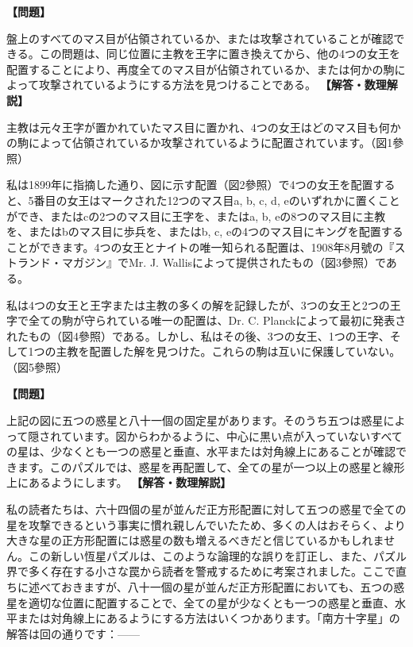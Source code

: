 \documentclass[10pt,a4paper,oneside,openany]{ltjsbook}
\begin{document}
\begin{tcolorbox}[colback=softblue,colframe=primaryblue,title=\textbf{第 313 問：女王と主教のパズル （原題: QUEENS AND BISHOP PUZZLE.）},arc=2mm,boxrule=1pt,breakable]
\textbf{【問題】}\par\vspace{0.3em}
盤上のすべてのマス目が佔領されているか、または攻撃されていることが確認できる。この問題は、同じ位置に主教を王字に置き換えてから、他の4つの女王を配置することにより、再度全てのマス目が佔領されているか、または何かの駒によって攻撃されているようにする方法を見つけることである。
\tcblower
\textbf{【解答・数理解説】}\par\vspace{0.3em}
主教は元々王字が置かれていたマス目に置かれ、4つの女王はどのマス目も何かの駒によって佔領されているか攻撃されているように配置されています。（図1參照）

私は1899年に指摘した通り、図に示す配置（図2參照）で4つの女王を配置すると、5番目の女王はマークされた12つのマス目a, b, c, d, eのいずれかに置くことができ、またはcの2つのマス目に王字を、またはa, b, eの8つのマス目に主教を、またはbのマス目に歩兵を、またはb, c, eの4つのマス目にキングを配置することができます。4つの女王とナイトの唯一知られる配置は、1908年8月號の『ストランド・マガジン』でMr. J. Wallisによって提供されたもの（図3參照）である。

私は4つの女王と王字または主教の多くの解を記録したが、3つの女王と2つの王字で全ての駒が守られている唯一の配置は、Dr. C. Planckによって最初に発表されたもの（図4參照）である。しかし、私はその後、3つの女王、1つの王字、そして1つの主教を配置した解を見つけた。これらの駒は互いに保護していない。（図5參照）
\end{tcolorbox}

\begin{tcolorbox}[colback=softblue,colframe=primaryblue,title=\textbf{第 314 問：南方十字星 （原題: THE SOUTHERN CROSS.）},arc=2mm,boxrule=1pt,breakable]
\textbf{【問題】}\par\vspace{0.3em}
上記の図に五つの惑星と八十一個の固定星があります。そのうち五つは惑星によって隠されています。図からわかるように、中心に黒い点が入っていないすべての星は、少なくとも一つの惑星と垂直、水平または対角線上にあることが確認できます。このパズルでは、惑星を再配置して、全ての星が一つ以上の惑星と線形上にあるようにします。
\tcblower
\textbf{【解答・数理解説】}\par\vspace{0.3em}
私の読者たちは、六十四個の星が並んだ正方形配置に対して五つの惑星で全ての星を攻撃できるという事実に慣れ親しんでいたため、多くの人はおそらく、より大きな星の正方形配置には惑星の数も増えるべきだと信じているかもしれません。この新しい恆星パズルは、このような論理的な誤りを訂正し、また、パズル界で多く存在する小さな罠から読者を警戒するために考案されました。ここで直ちに述べておきますが、八十一個の星が並んだ正方形配置においても、五つの惑星を適切な位置に配置することで、全ての星が少なくとも一つの惑星と垂直、水平または対角線上にあるようにする方法はいくつかあります。「南方十字星」の解答は回の通りです：——
\end{tcolorbox}
\end{document}
